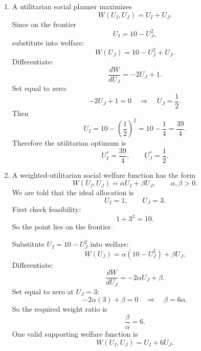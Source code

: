 \documentclass[12pt]{article}
\begin{document}
\begin{enumerate}[label=(\alph*)]
    \begin{center}
    \end{center}
    \item
    A utilitarian social planner maximizes
    \[
    W(U_I,U_J)=U_I+U_J.
    \]
    Since on the frontier
    \[
    U_I=10-U_J^2,
    \]
    substitute into welfare:
    \[
    W(U_J)=10-U_J^2+U_J.
    \]
    Differentiate:
    \[
    \frac{dW}{dU_J}=-2U_J+1.
    \]
    Set equal to zero:
    \[
    -2U_J+1=0
    \quad\Longrightarrow\quad
    U_J=\frac12.
    \]
    Then
    \[
    U_I=10-\left(\frac12\right)^2=10-\frac14=\frac{39}{4}.
    \]
    Therefore the utilitarian optimum is
    \[
    \boxed{U_I^*=\frac{39}{4},\qquad U_J^*=\frac12.}
    \]

    \item
    A weighted-utilitarian social welfare function has the form
    \[
    W(U_I,U_J)=\alpha U_I+\beta U_J,
    \qquad \alpha,\beta>0.
    \]
    We are told that the ideal allocation is
    \[
    U_I=1,\qquad U_J=3.
    \]
    First check feasibility:
    \[
    1+3^2=10.
    \]
    So the point lies on the frontier.

    Substitute \(U_I=10-U_J^2\) into welfare:
    \[
    W(U_J)=\alpha(10-U_J^2)+\beta U_J.
    \]
    Differentiate:
    \[
    \frac{dW}{dU_J}=-2\alpha U_J+\beta.
    \]
    Set equal to zero at \(U_J=3\):
    \[
    -2\alpha(3)+\beta=0
    \quad\Longrightarrow\quad
    \beta=6\alpha.
    \]
    So the required weight ratio is
    \[
    \boxed{\frac{\beta}{\alpha}=6.}
    \]
    One valid supporting welfare function is
    \[
    \boxed{W(U_I,U_J)=U_I+6U_J.}
    \]


\end{enumerate}
\end{document}
